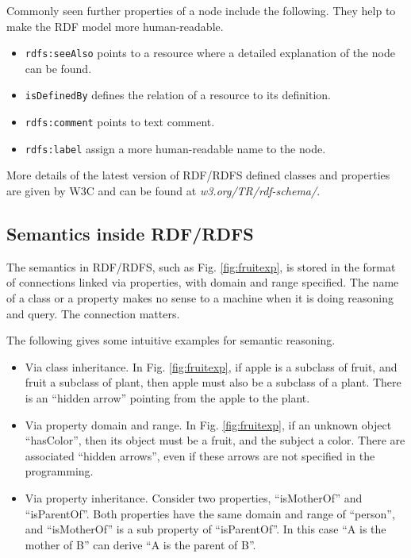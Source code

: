 Commonly seen further properties of a node include the following. They help to make the RDF model more human-readable.
\begin{itemize}
	\item \verb|rdfs:seeAlso| points to a resource where a detailed explanation of the node can be found.
	\item \verb|isDefinedBy| defines the relation of a resource to its definition.
	\item \verb|rdfs:comment| points to text comment.
	\item \verb|rdfs:label| assign a more human-readable name to the node.
\end{itemize}

More details of the latest version of RDF/RDFS defined classes and properties are given by W3C and can be found at \textit{w3.org/TR/rdf-schema/}.

\subsection{Semantics inside RDF/RDFS}

The semantics in RDF/RDFS, such as Fig. \ref{fig:fruitexp}, is stored in the format of connections linked via properties, with domain and range specified. The name of a class or a property makes no sense to a machine when it is doing reasoning and query. The connection matters.

The following gives some intuitive examples for semantic reasoning.
\begin{itemize}
	\item Via class inheritance. In Fig. \ref{fig:fruitexp}, if apple is a subclass of fruit, and fruit a subclass of plant, then apple must also be a subclass of a plant. There is an ``hidden arrow'' pointing from the apple to the plant.
	\item Via property domain and range. In Fig. \ref{fig:fruitexp}, if an unknown object ``hasColor'', then its object must be a fruit, and the subject a color. There are associated ``hidden arrows'', even if these arrows are not specified in the programming.
	\item Via property inheritance. Consider two properties, ``isMotherOf'' and ``isParentOf''. Both properties have the same domain and range of ``person'', and ``isMotherOf'' is a sub property of ``isParentOf''. In this case ``A is the mother of B'' can derive ``A is the parent of B''.
\end{itemize}

